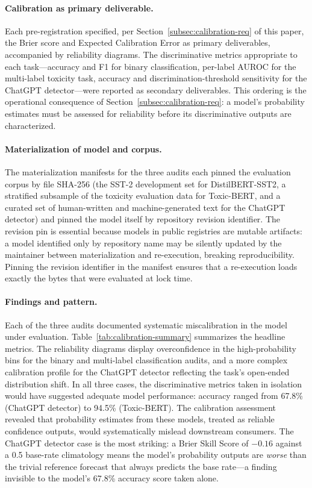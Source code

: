 \documentclass[11pt]{article}
\begin{document}
\paragraph{Calibration as primary deliverable.}
Each pre-registration specified, per Section~\ref{subsec:calibration-req}
of this paper, the Brier score \cite{brier1950} and Expected
Calibration Error \cite{naeini2015ece, guo2017calibration} as
primary deliverables, accompanied by reliability diagrams. The
discriminative metrics appropriate to each task---accuracy and
F1 for binary classification, per-label AUROC for the multi-label
toxicity task, accuracy and discrimination-threshold sensitivity
for the ChatGPT detector---were reported as secondary deliverables.
This ordering is the operational consequence of
Section~\ref{subsec:calibration-req}: a model's probability
estimates must be assessed for reliability before its
discriminative outputs are characterized.

\paragraph{Materialization of model and corpus.}
The materialization manifests for the three audits each pinned the
evaluation corpus by file SHA-256 (the SST-2 development set for
DistilBERT-SST2, a stratified subsample of the toxicity evaluation
data for Toxic-BERT, and a curated set of human-written and
machine-generated text for the ChatGPT detector) and pinned the
model itself by repository revision identifier. The revision pin
is essential because models in public registries are mutable
artifacts: a model identified only by repository name may be
silently updated by the maintainer between materialization and
re-execution, breaking reproducibility. Pinning the revision
identifier in the manifest ensures that a re-execution loads
exactly the bytes that were evaluated at lock time.

\paragraph{Findings and pattern.}
Each of the three audits documented systematic miscalibration in
the model under evaluation. Table~\ref{tab:calibration-summary}
summarizes the headline metrics. The reliability diagrams
\cite{dixon2026distilbert, dixon2026toxicbert,
dixon2026chatgptdetector} display overconfidence in the
high-probability bins for the binary and multi-label
classification audits, and a more complex calibration profile for
the ChatGPT detector reflecting the task's open-ended distribution
shift. In all three cases, the discriminative metrics taken in
isolation would have suggested adequate model performance: accuracy
ranged from 67.8\% (ChatGPT detector) to 94.5\% (Toxic-BERT). The
calibration assessment revealed that probability estimates from
these models, treated as reliable confidence outputs, would
systematically mislead downstream consumers. The ChatGPT detector
case is the most striking: a Brier Skill Score of $-0.16$ against a
0.5 base-rate climatology means the model's probability outputs are
\emph{worse} than the trivial reference forecast that always
predicts the base rate---a finding invisible to the model's
67.8\% accuracy score taken alone.
\end{document}
